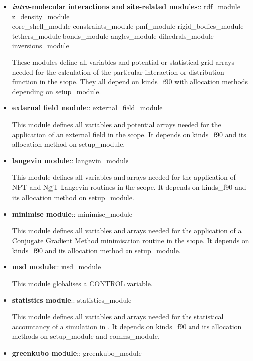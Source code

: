 \begin{itemize}
\item {\bf {\em intra}-molecular interactions and site-related
modules}:: {\sc rdf\_module z\_density\_module \\ core\_shell\_module
constraints\_module pmf\_module rigid\_bodies\_module \\ tethers\_module
bonds\_module angles\_module dihedrals\_module inversions\_module}

These modules define all variables and potential or statistical
grid arrays needed for the calculation of the particular interaction
or distribution function in the \D scope.  They all depend on {\sc kinds\_f90}
with allocation methods depending on {\sc setup\_module}.

\item {\bf external field module}:: {\sc external\_field\_module}

This module defines all variables and potential arrays needed for
the application of an external field in the \D scope.  It depends
on {\sc kinds\_f90} and its allocation method on {\sc setup\_module}.

\item {\bf langevin module}:: {\sc langevin\_module}

This module defines all variables and arrays needed for the
application of NPT and N$\mbox{$\underline{\underline{\bf \sigma}}$}$T Langevin routines
in the \D scope.  It depends on {\sc kinds\_f90} and its
allocation method on {\sc setup\_module}.

\item {\bf minimise module}:: {\sc minimise\_module}

This module defines all variables and arrays needed for the
application of a Conjugate Gradient Method minimisation routine
in the \D scope.  It depends on {\sc kinds\_f90} and its
allocation method on {\sc setup\_module}.

\item {\bf msd module}:: {\sc msd\_module}

This module globalises a CONTROL variable.

\item {\bf statistics module}:: {\sc statistics\_module}

This module defines all variables and arrays needed for the
statistical accountancy of a simulation in \D.  It depends on
{\sc kinds\_f90} and its allocation methods on {\sc setup\_module}
and {\sc comms\_module}.

\item {\bf greenkubo module}:: {\sc greenkubo\_module}


\end{itemize}

